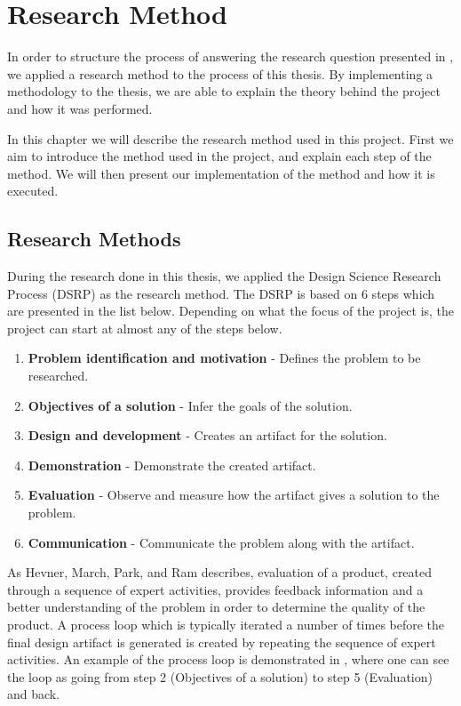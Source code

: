 
\chapter{Research Method} %
\label{cha:research_questions_and_method}
In order to structure the process of answering the research question presented
in , we applied a research method to the 
process of this thesis. By implementing a methodology to the thesis, we are
able to explain the theory behind the project and how it was performed.

In this chapter we will describe the research method used in this project.
First we aim to introduce the method used in the project, and explain each step
of the method. We will then present our implementation of the method and how it
is executed.
\section{Research Methods} %
\label{sec:research_method}

During the research done in this thesis, we applied the Design Science Research 
Process (DSRP) as the research method. The DSRP is based on 6 steps which are 
presented in the list below. Depending on what the focus of the project is, 
the project can start at almost any of the steps below. \cite{peffers2006design}

\begin{enumerate}
	\item \textbf{Problem identification and motivation} - Defines the problem to be
	researched. 
	\item \textbf{Objectives of a solution} - Infer the goals of the solution.
	\item \textbf{Design and development} - Creates an artifact for the solution.
	\item \textbf{Demonstration} - Demonstrate the created artifact.
	\item \textbf{Evaluation} - Observe and measure how the artifact gives a 
	solution to the problem.
	\item \textbf{Communication} - Communicate the problem along with the artifact.
\end{enumerate}

As Hevner, March, Park, and Ram \cite{von2004design} describes, 
evaluation of a product, created through a sequence of expert activities, 
provides feedback information and a better understanding of the problem in 
order to determine the quality of the product. A process loop which is typically 
iterated a number of times before the final design artifact is generated is created 
by repeating the sequence of expert activities. An example of the process loop 
is demonstrated in , where one can see the loop as going 
from step 2 (Objectives of a solution) to step 5 (Evaluation) and back.\\

